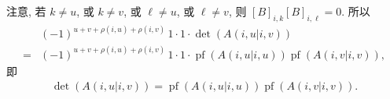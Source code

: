 \documentclass[../libro.tex]{subfiles}
\begin{document}
\begin{example}
    注意, 若 \(k \neq u\), 或 \(k \neq v\),
    或 \(\ell \neq u\), 或 \(\ell \neq v\),
    则 \([B]_{i,k} [B]_{i,\ell} = 0\).
    所以
    \begin{align*}
        &
        (-1)^{u+v+\rho(i,u)+\rho(i,v)}\,
        1 \cdot 1 \cdot
        \det {(A({i,u}|{i,v}))}
        \\
        = {} &
        (-1)^{u+v+\rho(i,u)+\rho(i,v)}\,
        1 \cdot 1 \cdot
        \operatorname{pf} {(A({i,u}|{i,u}))}
        \operatorname{pf} {(A({i,v}|{i,v}))},
    \end{align*}
    即
    \begin{align*}
        \det {(A({i,u}|{i,v}))}
        = \operatorname{pf} {(A({i,u}|{i,u}))}
        \operatorname{pf} {(A({i,v}|{i,v}))}.
    \end{align*}


\end{example}
\end{document}
